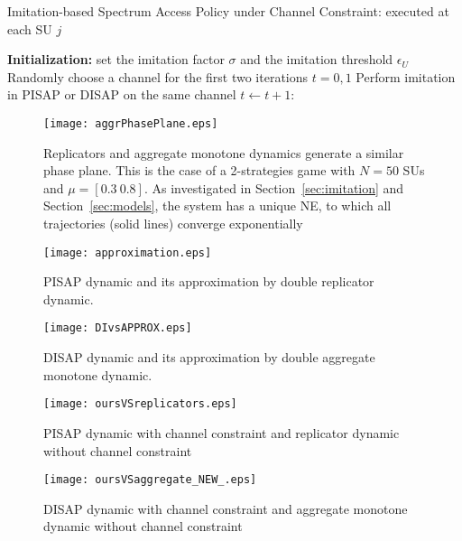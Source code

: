 \documentclass[12pt, onecolumn]{IEEEtran}
\theoremstyle{plain}
\theoremstyle{definition}
\begin{document}
\begin{algorithm}
\caption{Imitation-based Spectrum Access Policy under Channel Constraint: executed at each SU $j$}
\begin{algorithmic}[1]
\STATE \textbf{Initialization:} set the imitation factor $\sigma$ and the imitation threshold $\epsilon_U$
\STATE Randomly choose a channel for the first two iterations $t=0,1$
\STATE Perform imitation in PISAP or DISAP on the same channel
\STATE $t \leftarrow t+1$:
\ENDWHILE
\end{algorithmic}
\label{algo:generic_imitation}
\end{algorithm}



\begin{figure}
 \centering
\texttt{[image: aggrPhasePlane.eps]}
\caption{Replicators and aggregate monotone dynamics generate a similar phase plane. This is the case of a 2-strategies game with $N=50$ SUs and $\mu{}=[0.3~0.8]$. As investigated in
Section~\ref{sec:imitation} and Section~\ref{sec:models}, the system has a unique NE, to which all trajectories (solid lines) converge exponentially}
\label{fig:phasePlane}
\end{figure}

\begin{figure*} \begin{minipage}[r]{0.49\linewidth}
\texttt{[image: approximation.eps]}
\caption{PISAP dynamic and its approximation by double replicator dynamic.}
\label{fig:approximation}
\end{minipage} \hfill
\begin{minipage}[c]{0.49\linewidth}
\texttt{[image: DIvsAPPROX.eps]}
\caption{DISAP dynamic and its approximation by double aggregate monotone dynamic.}
\label{fig:DIvsAPPROX}
\end{minipage}\hfill
\vspace{0.5cm}
\end{figure*}

\begin{figure*}
\begin{minipage}[r]{0.49\linewidth}
\texttt{[image: oursVSreplicators.eps]}
\caption{PISAP dynamic with channel constraint and replicator dynamic without channel constraint}
\label{fig:oursVSreplicators}
\end{minipage} \hfill
\begin{minipage}[c]{0.49\linewidth}
\texttt{[image: oursVSaggregate\_NEW\_.eps]}
\caption{DISAP dynamic with channel constraint and aggregate monotone dynamic without channel constraint}
\label{fig:oursVSaggregate}
\end{minipage}\hfill
\vspace{0.5cm}
\end{figure*}
\end{document}
